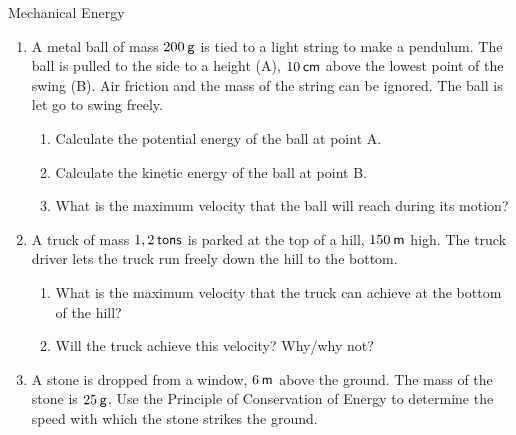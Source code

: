 \begin{eocexercises}{Mechanical Energy}
\begin{enumerate}[noitemsep, label=\textbf{\arabic*}. ]
\label{m38786*id71971}\begin{enumerate}[noitemsep, label=\textbf{\alph*}. ] 
            \label{m38786*uid133}\item What is the maximum height that the rock will reach?
\label{m38786*uid134}\item Draw graphs to show how the potential energy, kinetic energy and mechanical energy of the rock changes as it moves to its highest point.
\end{enumerate}
                  \label{m38786*uid135}\item A metal ball of mass $200\phantom{\rule{2pt}{0ex}}\mathsf{g}$ is tied to a light string to make a pendulum. The ball is pulled to the side to a height (A), $10\phantom{\rule{2pt}{0ex}}\mathsf{cm}$ above the lowest point of the swing (B). Air friction and the mass of the string can be ignored. The ball is let go to swing freely.
\label{m38786*id72026}\begin{enumerate}[noitemsep, label=\textbf{\alph*}. ] 
            \label{m38786*uid136}\item Calculate the potential energy of the ball at point A.
\label{m38786*uid137}\item Calculate the kinetic energy of the ball at point B.
\label{m38786*uid138}\item What is the maximum velocity that the ball will reach during its motion?
\end{enumerate}
                \label{m38786*uid139}\item A truck of mass $1,2\phantom{\rule{2pt}{0ex}}\mathsf{tons}$ is parked at the top of a hill, $150\phantom{\rule{2pt}{0ex}}\mathsf{m}$ high. The truck driver lets the truck run freely down the hill to the bottom.
\label{m38786*id72082}\begin{enumerate}[noitemsep, label=\textbf{\alph*}. ] 
            \label{m38786*uid140}\item What is the maximum velocity that the truck can achieve at the bottom of the hill?
\label{m38786*uid141}\item Will the truck achieve this velocity? Why/why not?
\end{enumerate}
                \label{m38786*uid142}\item A stone is dropped from a window, $6\phantom{\rule{2pt}{0ex}}\mathsf{m}$ above the ground. The mass of the stone is $25\phantom{\rule{2pt}{0ex}}\mathsf{g}$.
Use the Principle of Conservation of Energy to determine the speed with which the stone strikes the ground.
           \end{enumerate}

\end{eocexercises}
